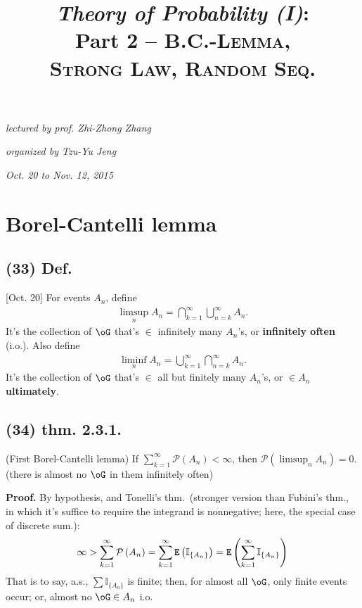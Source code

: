 \documentclass[12pt]{article}
\newcommand{\oo}\infty%
\newcommand{\Rb}[1]{ \left( #1 \right) }%
\newcommand{\BF}[1]{ \mathbb{#1} }%
\newcommand{\CF}[1]{ \mathcal{#1} }%
\newcommand{\Ss}[1]{\textsf{\bfseries{#1}}}%
\newcommand{\Tw}[1]{\texttt{\bfseries{#1}}}%
\newcommand{\EqGo}[1]{ \begin{gather*}{#1}\end{gather*} } %
\renewcommand{\P}[1]{ \CF P \Rb{#1} }%
\newcommand{\E}[1]{ \Tw{E}\Rb{#1} }%
\newcommand{\I}[1]{ \BF I_{\{#1\}} }%
\begin{document}
\title{\textit{\textbf{\huge Theory of Probability (I)}}: \\ Part 2 -- \textsc{B.C.-Lemma, \\ Strong Law, Random Seq.}}
\date{}
\author{}
\maketitle
\allowdisplaybreaks[4]%

\vspace{-3.7cm} %
\hfill{\itshape lectured by prof. Zhi-Zhong Zhang} \par
\hfill{\itshape organized by Tzu-Yu Jeng} \par
\hfill{\itshape Oct. 20 to Nov. 12, 2015} \\
\vspace{-0.7cm} 

\setcounter{section}{4}
\section{Borel-Cantelli lemma}
\subsection*{(33) Def.} [Oct. 20] For events \(A_n\), define \EqGo{
 \limsup_n A_n = \bigcap_{k=1}^\oo \bigcup_{n=k}^\oo A_n.
} It's the collection of \(\oG\) that's \(\in\) infinitely many \(A_n\)'s, or \Ss{infinitely often} (i.o.). Also define \EqGo{
 \liminf_n A_n = \bigcup_{k=1}^\oo \bigcap_{n=k}^\oo A_n.
} It's the collection of \(\oG\) that's \(\in\) all but finitely many \(A_n\)'s, or \(\in A_n\) \Ss{ultimately}. 

\subsection*{(34) thm. 2.3.1.} (First Borel-Cantelli lemma) If \(\sum_{k=1}^\oo \P{A_n} < \oo\), then \(\P{\limsup_n A_n} =0\). (there is almost no \(\oG\) in them infinitely often) \par
\Ss{Proof.} By hypothesis, and Tonelli's thm.\ (stronger version than Fubini's thm., in which it's suffice to require the integrand is nonnegative; here, the special case of discrete sum.): \EqGo{
 \oo > \sum_{k=1}^\oo \P{A_n} 
 = \sum_{k=1}^\oo \E{ \I{A_n} } 
 = \E{ \sum_{k=1}^\oo \I{A_n} }
} That is to say, a.s., \(\sum \I{A_n}\) is finite; 
then, for almost all \(\oG\), only finite events occur; or, almost no \(\oG \in A_n\) i.o. 
\end{document}

